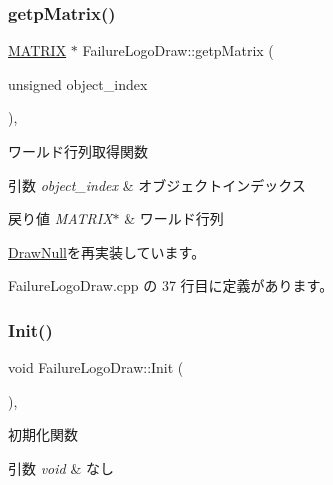 \subsubsection{\texorpdfstring{getp\+Matrix()}{getpMatrix()}}
{\footnotesize\ttfamily \mbox{\hyperlink{_matrix_8h_a032295cd9fb1b711757c90667278e744}{M\+A\+T\+R\+IX}} $\ast$ Failure\+Logo\+Draw\+::getp\+Matrix (\begin{DoxyParamCaption}\item[{unsigned}]{object\+\_\+index }\end{DoxyParamCaption})\hspace{0.3cm}{\ttfamily [override]}, {\ttfamily [virtual]}}



ワールド行列取得関数 


\begin{DoxyParams}{引数}
{\em object\+\_\+index} & オブジェクトインデックス \\
\hline
\end{DoxyParams}

\begin{DoxyRetVals}{戻り値}
{\em M\+A\+T\+R\+I\+X$\ast$} & ワールド行列 \\
\hline
\end{DoxyRetVals}


\mbox{\hyperlink{class_draw_null_a9aac059eb3b5d1f77e8bd3aa0647cff9}{Draw\+Null}}を再実装しています。



 Failure\+Logo\+Draw.\+cpp の 37 行目に定義があります。

\mbox{\label{class_failure_logo_draw_a718d587edcabb1feea72153a79a65176}} 
\subsubsection{\texorpdfstring{Init()}{Init()}}
{\footnotesize\ttfamily void Failure\+Logo\+Draw\+::\+Init (\begin{DoxyParamCaption}{ }\end{DoxyParamCaption})\hspace{0.3cm}{\ttfamily [override]}, {\ttfamily [virtual]}}



初期化関数 


\begin{DoxyParams}{引数}
{\em void} & なし \\
\hline
\end{DoxyParams}

